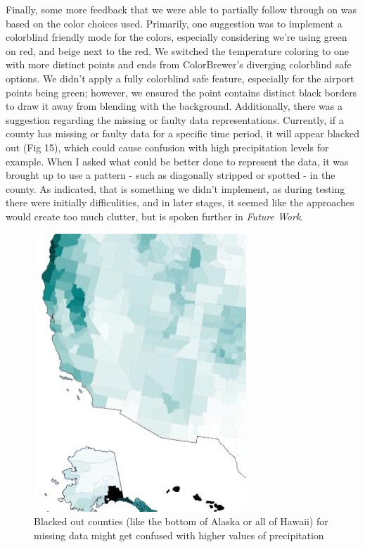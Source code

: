 \documentclass[10pt,twocolumn,twoside]{opticajnl}
\begin{document}
Finally, some more feedback that we were able to partially follow through on was based on the color choices used. Primarily, one suggestion was to implement a colorblind friendly mode for the colors, especially considering we're using green on red, and beige next to the red. We switched the temperature coloring to one with more distinct points and ends from ColorBrewer's \cite{colorbrewer} diverging colorblind safe options. We didn't apply a fully colorblind safe feature, especially for the airport points being green; however, we ensured the point contains distinct black borders to draw it away from blending with the background. Additionally, there was a suggestion regarding the missing or faulty data representations. Currently, if a county has missing or faulty data for a specific time period, it will appear blacked out (Fig 15), which could cause confusion with high precipitation levels for example. When I asked what could be better done to represent the data, it was brought up to use a pattern - such as diagonally stripped or spotted - in the county. As indicated, that is something we didn't implement, as during testing there were initially difficulities, and in later stages, it seemed like the approaches would create too much clutter, but is spoken further in \textit{Future Work}.


\begin{figure}
	\centering
	\includegraphics[scale=0.35]{images/countyBlacked.jpg}
	\caption{Blacked out counties (like the bottom of Alaska or all of Hawaii) for missing data might get confused with higher values of precipitation}
\end{figure}
\end{document}
